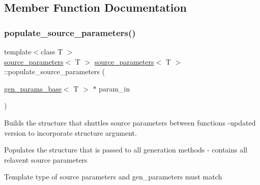 \subsection{Member Function Documentation}
\mbox{\label{structsource__parameters_aa6b0e1aa5122c2887a3db4d40714ac84}} 
\subsubsection{\texorpdfstring{populate\+\_\+source\+\_\+parameters()}{populate\_source\_parameters()}}
{\footnotesize\ttfamily template$<$class T $>$ \\
\hyperlink{structsource__parameters}{source\+\_\+parameters}$<$ T $>$ \hyperlink{structsource__parameters}{source\+\_\+parameters}$<$ T $>$\+::populate\+\_\+source\+\_\+parameters (\begin{DoxyParamCaption}\item[{\hyperlink{classgen__params__base}{gen\+\_\+params\+\_\+base}$<$ T $>$ $\ast$}]{param\+\_\+in }\end{DoxyParamCaption})\hspace{0.3cm}{\ttfamily [static]}}



Builds the structure that shuttles source parameters between functions -\/updated version to incorporate structure argument. 

Populates the structure that is passed to all generation methods -\/ contains all relavent source parameters

Template type of source parameters and gen\+\_\+parameters must match \mbox{\label{structsource__parameters_a1b9db2c7d8abf202ca908fd4e58b0949}} 
